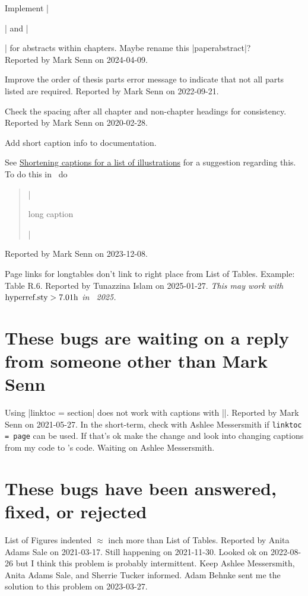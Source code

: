 Implement |\begin{chapterabstract}|
and |\end{chapterabstract}|
for abstracts within chapters.
Maybe rename this |paperabstract|?\\
{\small
  Reported by Mark Senn on 2024-04-09.
}

Improve the order of thesis parts error message
to indicate that not all parts listed are required.
{\small
  Reported by Mark Senn on 2022-09-21.%
}

Check the spacing after all chapter and non-chapter headings
for consistency.
{\small
  Reported by Mark Senn on 2020-02-28.%
}

Add short caption info to documentation.
{\small
  See
  \href{https://www-chicagomanualofstyle-org.ezproxy.lib.purdue.edu/book/ed17/part1/ch03/psec040.html}{Shortening captions for a list of illustrations}
  for a suggestion regarding this.
  To do this in \LaTeXLogo\ do\hfil\break
  \begin{quote}
    |\caption[short caption]{long caption}|
  \end{quote}
  Reported by Mark Senn on 2023-12-08.%
}

Page links for longtables don't link to right place
from List of Tables.
{\small
  Example: Table R.6.
  Reported by Tunazzina Islam on 2025-01-27.%
  {\it This may work with \(\text{hyperref.sty} > 7.01\text h\) in \TeXLiveLogo\ 2025.}
}


\section{These bugs are waiting on a reply from someone other than Mark Senn}

Using
|linktoc = section|
does not work with captions with
|\frac|.
{\small
  Reported by Mark Senn on 2021-05-27.
  In the short-term,
  check with Ashlee Messersmith
  if {\tt linktoc = page} can be used.
  If that's ok make the change
  and look into changing captions from my code
  to \LaTeXLogo's code.
  Waiting on Ashlee Messersmith.
}


\section{These bugs have been answered, fixed, or rejected}

List of Figures indented $\approx$ inch
more than List of Tables.
{\small
  Reported by Anita Adams Sale on 2021-03-17.
  Still happening on 2021-11-30.
  Looked ok on 2022-08-26
  but I think this problem is probably intermittent.
  Keep Ashlee Messersmith,
  Anita Adams Sale,
  and Sherrie Tucker informed.
  Adam Behnke sent me the solution to this problem on 2023-03-27.
}

